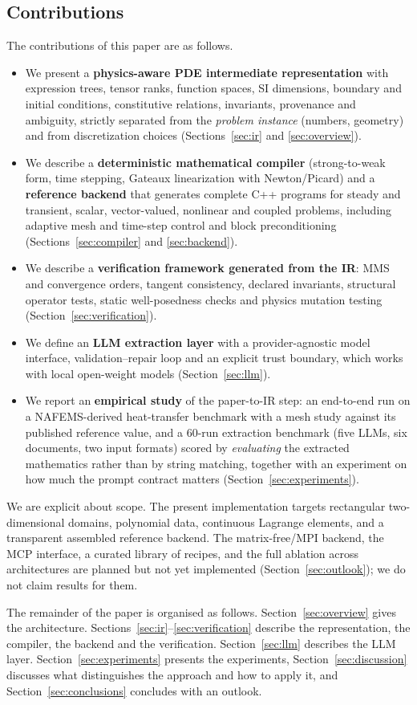 \subsection{Contributions}
\label{sec:contrib}
The contributions of this paper are as follows.
\begin{itemize}
\item We present a \textbf{physics-aware PDE intermediate representation} with expression trees, tensor ranks, function spaces, SI dimensions, boundary and initial conditions, constitutive relations, invariants, provenance and ambiguity, strictly separated from the \emph{problem instance} (numbers, geometry) and from discretization choices (Sections~\ref{sec:ir} and \ref{sec:overview}).
\item We describe a \textbf{deterministic mathematical compiler} (strong-to-weak form, time stepping, Gateaux linearization with Newton/Picard) and a \textbf{\dealii{} reference backend} that generates complete C++ programs for steady and transient, scalar, vector-valued, nonlinear and coupled problems, including adaptive mesh and time-step control and block preconditioning (Sections~\ref{sec:compiler} and \ref{sec:backend}).
\item We describe a \textbf{verification framework generated from the IR}: MMS and convergence orders, tangent consistency, declared invariants, structural operator tests, static well-posedness checks and physics mutation testing (Section~\ref{sec:verification}).
\item We define an \textbf{LLM extraction layer} with a provider-agnostic model interface, validation--repair loop and an explicit trust boundary, which works with local open-weight models (Section~\ref{sec:llm}).
\item We report an \textbf{empirical study} of the paper-to-IR step: an end-to-end run on a NAFEMS-derived heat-transfer benchmark with a mesh study against its published reference value, and a 60-run extraction benchmark (five LLMs, six documents, two input formats) scored by \emph{evaluating} the extracted mathematics rather than by string matching, together with an experiment on how much the prompt contract matters (Section~\ref{sec:experiments}).
\end{itemize}
We are explicit about scope. The present implementation targets rectangular two-dimensional domains, polynomial data, continuous Lagrange elements, and a transparent assembled reference backend. The matrix-free/MPI backend, the MCP interface, a curated library of \dealii{} recipes, and the full ablation across architectures are planned but not yet implemented (Section~\ref{sec:outlook}); we do not claim results for them.

The remainder of the paper is organised as follows. Section~\ref{sec:overview} gives the architecture. Sections~\ref{sec:ir}--\ref{sec:verification} describe the representation, the compiler, the backend and the verification. Section~\ref{sec:llm} describes the LLM layer. Section~\ref{sec:experiments} presents the experiments, Section~\ref{sec:discussion} discusses what distinguishes the approach and how to apply it, and Section~\ref{sec:conclusions} concludes with an outlook.
